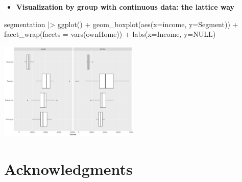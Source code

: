 \documentclass[
  ignorenonframetext,
]{beamer}
\newenvironment{Shaded}{\begin{snugshade}}{\end{snugshade}}
\newcommand{\AttributeTok}[1]{\textcolor[rgb]{0.40,0.45,0.13}{#1}}
\newcommand{\ConstantTok}[1]{\textcolor[rgb]{0.56,0.35,0.01}{#1}}
\newcommand{\FunctionTok}[1]{\textcolor[rgb]{0.28,0.35,0.67}{#1}}
\newcommand{\NormalTok}[1]{\textcolor[rgb]{0.00,0.23,0.31}{#1}}
\newcommand{\SpecialCharTok}[1]{\textcolor[rgb]{0.37,0.37,0.37}{#1}}
\newcommand{\StringTok}[1]{\textcolor[rgb]{0.13,0.47,0.30}{#1}}
\providecommand{\tightlist}{%
  \setlength{\itemsep}{0pt}\setlength{\parskip}{0pt}}\usepackage{longtable,booktabs,array}
\begin{document}
\begin{frame}[fragile]{}
\label{section-20}
\begin{itemize}
\tightlist
\item
  \textbf{Visualization by group with continuous data: the lattice way}
\end{itemize}

\tiny

\begin{Shaded}
\begin{Highlighting}[]
\NormalTok{segmentation }\SpecialCharTok{|\textgreater{}} \FunctionTok{ggplot}\NormalTok{() }\SpecialCharTok{+}
  \FunctionTok{geom\_boxplot}\NormalTok{(}\FunctionTok{aes}\NormalTok{(}\AttributeTok{x=}\NormalTok{income, }\AttributeTok{y=}\NormalTok{Segment)) }\SpecialCharTok{+}
  \FunctionTok{facet\_wrap}\NormalTok{(}\AttributeTok{facets =} \FunctionTok{vars}\NormalTok{(ownHome)) }\SpecialCharTok{+}
  \FunctionTok{labs}\NormalTok{(}\AttributeTok{x=}\StringTok{\textquotesingle{}Income\textquotesingle{}}\NormalTok{,}
       \AttributeTok{y=}\ConstantTok{NULL}\NormalTok{)}
\end{Highlighting}
\end{Shaded}

\begin{center}
\includegraphics[width=0.5\textwidth,height=\textheight]{005_comparing_groups_tables_and_visualizations_files/figure-beamer/unnamed-chunk-22-1.pdf}
\end{center}
\end{frame}

\section{Acknowledgments}\label{acknowledgments}
\end{document}
